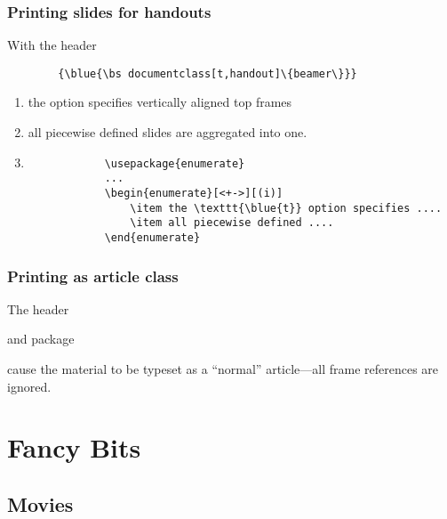 \begin{frame}[fragile]
	\frametitle{Printing slides for handouts}
	
	With the header
	
	\begin{verbatim}
		{\blue{\bs documentclass[t,handout]\{beamer\}}}
	\end{verbatim}
	
	\begin{enumerate}[<+->][(i)]
		\item the \texttt{} option specifies vertically aligned top frames
		\item all piecewise defined slides are aggregated into one.
		
		\item
		\begin{verbatim}
			\usepackage{enumerate}
			...
			\begin{enumerate}[<+->][(i)]
				\item the \texttt{\blue{t}} option specifies ....
				\item all piecewise defined ....
			\end{enumerate}
		\end{verbatim}
	\end{enumerate}
	
	
\end{frame}


\begin{frame}
	\frametitle{Printing as article class}
	
	The header
	
	{}
	
	and package
	
	{}
	
	cause the material to be typeset as a ``normal'' article---all frame references are ignored.
\end{frame}

\section{Fancy Bits}

\subsection{Movies}

